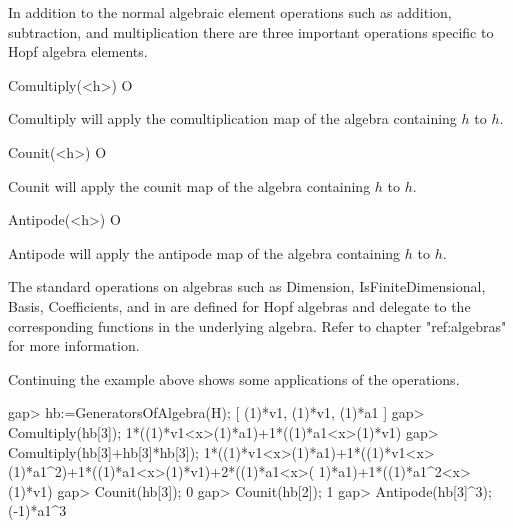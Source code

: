 In addition to the normal algebraic element operations such as addition, 
subtraction, and multiplication there are three
important operations specific to Hopf algebra elements.

\>Comultiply(<h>) O

Comultiply will apply the comultiplication map of the algebra containing $h$ to $h$.

\>Counit(<h>) O

Counit will apply the counit map of the algebra containing $h$ to $h$.

\>Antipode(<h>) O

Antipode will apply the antipode map of the algebra containing $h$ to $h$.

The standard operations on algebras such as Dimension, IsFiniteDimensional, Basis, Coefficients, 
and in are defined for Hopf algebras and delegate to the corresponding functions in the underlying algebra.  
Refer to chapter "ref:algebras" for more information.

Continuing the example above shows some applications of the operations.

\beginexample
gap> hb:=GeneratorsOfAlgebra(H);
[ (1)*v1, (1)*v1, (1)*a1 ]
gap> Comultiply(hb[3]);
1*((1)*v1<x>(1)*a1)+1*((1)*a1<x>(1)*v1)
gap> Comultiply(hb[3]+hb[3]*hb[3]);
1*((1)*v1<x>(1)*a1)+1*((1)*v1<x>(1)*a1^2)+1*((1)*a1<x>(1)*v1)+2*((1)*a1<x>(
1)*a1)+1*((1)*a1^2<x>(1)*v1)
gap> Counit(hb[3]);
0
gap> Counit(hb[2]);
1
gap> Antipode(hb[3]^3);
(-1)*a1^3
\endexample

